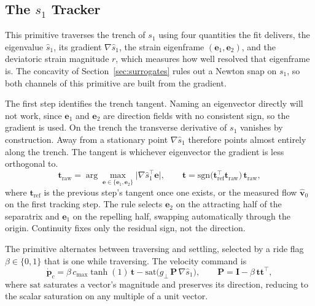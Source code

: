 \documentclass[lettersize,journal]{IEEEtran}
\begin{document}
\subsection{The $s_1$ Tracker}
\label{sec:s1_controller}

This primitive traverses the trench of $s_1$ using four quantities the
fit delivers, the eigenvalue $\hat{s}_1$, its gradient
$\nabla\hat{s}_1$, the strain eigenframe $(\mathbf{e}_1, \mathbf{e}_2)$,
and the deviatoric strain magnitude $r$, which measures how well resolved
that eigenframe is. The concavity of Section~\ref{sec:surrogates} rules
out a Newton snap on $s_1$, so both
channels of this primitive are built from the gradient.

The first step identifies the trench tangent. Naming an eigenvector
directly will not work, since $\mathbf{e}_1$ and $\mathbf{e}_2$ are
direction fields with no consistent sign, so the gradient is used. On
the trench the transverse derivative of $s_1$ vanishes by construction.
Away from a stationary point $\nabla\hat{s}_1$ therefore points almost entirely along the trench. The tangent is whichever eigenvector the gradient is less orthogonal to.
\begin{equation}
    \mathbf{t}_{\mathrm{raw}} =
    \arg\max_{\mathbf{e} \in \{\mathbf{e}_1, \mathbf{e}_2\}}
    \bigl\lvert \nabla\hat{s}_1^\top \mathbf{e} \bigr\rvert,
    \qquad
    \mathbf{t} = \mathrm{sgn}\bigl(\mathbf{t}_{\mathrm{ref}}^\top
    \mathbf{t}_{\mathrm{raw}}\bigr)\,\mathbf{t}_{\mathrm{raw}},
    \label{eq:tangent_select}
\end{equation}
where $\mathbf{t}_{\mathrm{ref}}$ is the previous step's tangent once one
exists, or the measured flow $\hat{\mathbf{v}}_0$ on the
first tracking step. The rule selects $\mathbf{e}_2$ on the attracting
half of the separatrix and $\mathbf{e}_1$ on the repelling half, swapping
automatically through the origin. Continuity fixes only the residual
sign, not the direction.

The primitive alternates between traversing and settling, selected by a ride flag $\beta \in \{0,1\}$ that is one while traversing. The velocity command is
\begin{equation}
    \dot{\mathbf{p}}_c =
    \beta\,c_{\max}\tanh(1)\,\mathbf{t}
    - \mathrm{sat}\!\bigl(g_\perp\,\mathbf{P}\,\nabla\hat{s}_1\bigr),
    \qquad
    \mathbf{P} = \mathbf{I} - \beta\,\mathbf{t}\mathbf{t}^\top,
\end{equation}
where $\mathrm{sat}$ saturates a vector's magnitude and preserves its
direction, reducing to the scalar saturation on any multiple of a unit
vector.
\end{document}
